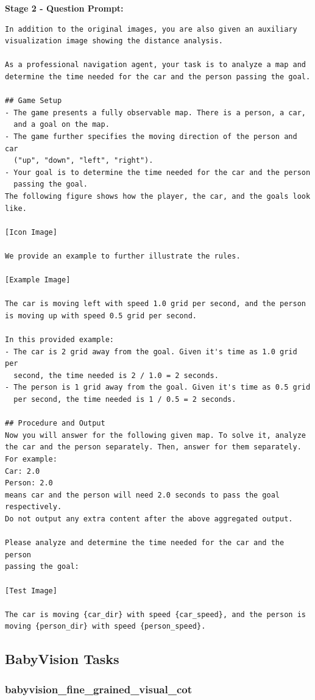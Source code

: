 \documentclass{article}
\theoremstyle{plain}
\theoremstyle{definition}
\theoremstyle{remark}
\begin{document}
\textbf{Stage 2 - Question Prompt:}

\begin{verbatim}
In addition to the original images, you are also given an auxiliary
visualization image showing the distance analysis.

As a professional navigation agent, your task is to analyze a map and
determine the time needed for the car and the person passing the goal.

## Game Setup
- The game presents a fully observable map. There is a person, a car,
  and a goal on the map.
- The game further specifies the moving direction of the person and car
  ("up", "down", "left", "right").
- Your goal is to determine the time needed for the car and the person
  passing the goal.
The following figure shows how the player, the car, and the goals look
like.

[Icon Image]

We provide an example to further illustrate the rules.

[Example Image]

The car is moving left with speed 1.0 grid per second, and the person
is moving up with speed 0.5 grid per second.

In this provided example:
- The car is 2 grid away from the goal. Given it's time as 1.0 grid per
  second, the time needed is 2 / 1.0 = 2 seconds.
- The person is 1 grid away from the goal. Given it's time as 0.5 grid
  per second, the time needed is 1 / 0.5 = 2 seconds.

## Procedure and Output
Now you will answer for the following given map. To solve it, analyze
the car and the person separately. Then, answer for them separately.
For example:
Car: 2.0
Person: 2.0
means car and the person will need 2.0 seconds to pass the goal
respectively.
Do not output any extra content after the above aggregated output.

Please analyze and determine the time needed for the car and the person
passing the goal:

[Test Image]

The car is moving {car_dir} with speed {car_speed}, and the person is
moving {person_dir} with speed {person_speed}.
\end{verbatim}

\subsection{BabyVision Tasks}

\subsubsection{babyvision\_fine\_grained\_visual\_cot}
\end{document}
